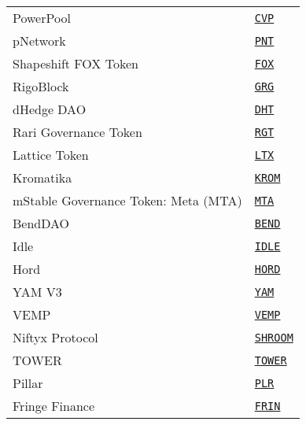\begin{tabular}{ll}
PowerPool & \href{https://etherscan.io/address/0x38e4adb44ef08f22f5b5b76a8f0c2d0dcbe7dca1}{\tt CVP} \\
pNetwork & \href{https://etherscan.io/address/0x89ab32156e46f46d02ade3fecbe5fc4243b9aaed}{\tt PNT} \\
Shapeshift FOX Token & \href{https://etherscan.io/address/0xc770eefad204b5180df6a14ee197d99d808ee52d}{\tt FOX} \\
RigoBlock & \href{https://etherscan.io/address/0x4fbb350052bca5417566f188eb2ebce5b19bc964}{\tt GRG} \\
dHedge DAO & \href{https://etherscan.io/address/0xca1207647ff814039530d7d35df0e1dd2e91fa84}{\tt DHT} \\
Rari Governance Token & \href{https://etherscan.io/address/0xd291e7a03283640fdc51b121ac401383a46cc623}{\tt RGT} \\
Lattice Token & \href{https://etherscan.io/address/0xa393473d64d2F9F026B60b6Df7859A689715d092}{\tt LTX} \\
Kromatika & \href{https://etherscan.io/address/0x3af33bef05c2dcb3c7288b77fe1c8d2aeba4d789}{\tt KROM} \\
mStable Governance Token: Meta (MTA) & \href{https://etherscan.io/address/0xa3BeD4E1c75D00fa6f4E5E6922DB7261B5E9AcD2}{\tt MTA} \\
BendDAO & \href{https://etherscan.io/address/0x0d02755a5700414b26ff040e1de35d337df56218}{\tt BEND} \\
Idle & \href{https://etherscan.io/address/0x875773784Af8135eA0ef43b5a374AaD105c5D39e}{\tt IDLE} \\
Hord & \href{https://etherscan.io/address/0x43a96962254855f16b925556f9e97be436a43448}{\tt HORD} \\
YAM V3 & \href{https://etherscan.io/address/0x0aacfbec6a24756c20d41914f2caba817c0d8521}{\tt YAM} \\
VEMP & \href{https://etherscan.io/address/0xcfeb09c3c5f0f78ad72166d55f9e6e9a60e96eec}{\tt VEMP} \\
Niftyx Protocol & \href{https://etherscan.io/address/0xed0439eacf4c4965ae4613d77a5c2efe10e5f183}{\tt SHROOM} \\
TOWER & \href{https://etherscan.io/address/0x1c9922314ed1415c95b9fd453c3818fd41867d0b}{\tt TOWER} \\
Pillar & \href{https://etherscan.io/address/0xe3818504c1b32bf1557b16c238b2e01fd3149c17}{\tt PLR} \\
Fringe Finance & \href{https://etherscan.io/address/0xC9fE6E1C76210bE83DC1B5b20ec7FD010B0b1D15}{\tt FRIN} \\

\end{tabular}
